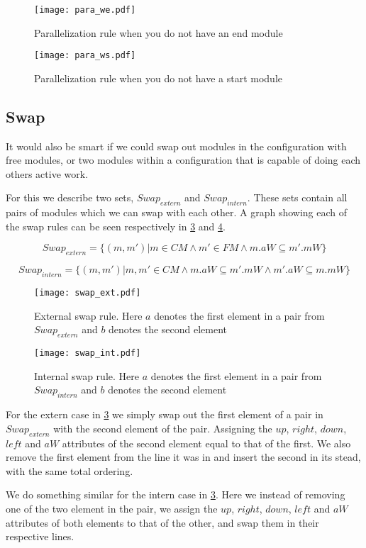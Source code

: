 \begin{figure}[h]
\centering
\texttt{[image: para\_we.pdf]}
\caption{Parallelization rule when you do not have an end module}
\label{fig:para_we}
\end{figure}

\begin{figure}[h]
\centering
\texttt{[image: para\_ws.pdf]}
\caption{Parallelization rule when you do not have a start module}
\label{fig:para_ws}
\end{figure}




\subsection{Swap}
It would also be smart if we could swap out modules in the configuration with free modules, or two modules within a configuration that is capable of doing each others active work.

For this we describe two sets, $Swap_{extern}$ and $Swap_{intern}$. These sets contain all pairs of modules which we can swap with each other. A graph showing each of the swap rules can be seen respectively in \cref{fig:swap_ext} and \cref{fig:swap_int}.

\[Swap_{extern} = \{(m, m') | m \in CM \land m' \in FM \land m.aW \subseteq m'.mW \}\]

\[Swap_{intern} = \{(m, m') | m, m' \in CM \land m.aW \subseteq m'.mW \land m'.aW \subseteq m.mW \}\]

\begin{figure}[h]
\centering
\texttt{[image: swap\_ext.pdf]}
\caption{External swap rule. Here $a$ denotes the first element in a pair from $Swap_{extern}$ and $b$ denotes the second element}
\label{fig:swap_ext}
\end{figure}

\begin{figure}[h]
\centering
\texttt{[image: swap\_int.pdf]}
\caption{Internal swap rule. Here $a$ denotes the first element in a pair from $Swap_{intern}$ and $b$ denotes the second element}
\label{fig:swap_int}
\end{figure}

For the extern case in \cref{fig:swap_ext} we simply swap out the first element of a pair in $Swap_{extern}$ with the second element of the pair. Assigning the $up$, $right$, $down$, $left$ and $aW$ attributes of the second element equal to that of the first. We also remove the first element from the line it was in and insert the second in its stead, with the same total ordering.

We do something similar for the intern case in \cref{fig:swap_ext}. Here we instead of removing one of the two element in the pair, we assign the $up$, $right$, $down$, $left$ and $aW$ attributes of both elements to that of the other, and swap them in their respective lines.